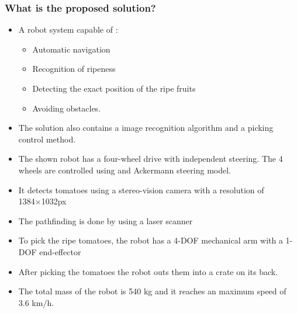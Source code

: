 \subsubsection*{What is the proposed solution?} 
\begin{itemize}
    \item A robot system capable of : \begin{itemize}
        \item Automatic navigation
        \item Recognition of ripeness
        \item Detecting the exact position of the ripe fruits
        \item Avoiding obstacles.
    \end{itemize}
    \item The solution also contains a image recognition algorithm and a picking control method.
    \item The shown robot has a four-wheel drive with independent steering. The 4 wheels are controlled using and Ackermann steering model.
    \item It detects tomatoes using a stereo-vision camera with a resolution of 1384×1032px
    \item The pathfinding is done by using a laser scanner
    \item To pick the ripe tomatoes, the robot has a 4-DOF mechanical arm with a 1-DOF end-effector 
    \item After picking the tomatoes the robot outs them into a crate on its back.
    \item The total mass of the robot is 540 kg and it reaches an maximum speed of 3.6 km/h.
\end{itemize}
